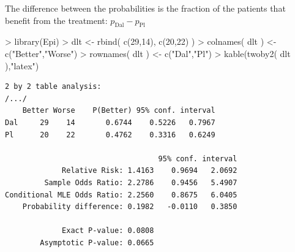 \documentclass[handout,12pt,dvipsnames,t]{beamer}
\begin{document}
\begin{frame}[fragile]
The difference between the probabilities is the fraction of the
patients that benefit from the treatment: $ p_\text{Dal}- p_\text{Pl}$


\begin{footnotesize}
\begin{Schunk}
\begin{Sinput}
> library(Epi)
> dlt <- rbind( c(29,14), c(20,22) )
> colnames( dlt ) <- c("Better","Worse")
> rownames( dlt ) <- c("Dal","Pl")
> kable(twoby2( dlt ),"latex")
\end{Sinput}
\end{Schunk}
\end{footnotesize}


\begin{footnotesize}
\begin{lstlisting}
2 by 2 table analysis:
/.../
    Better Worse    P(Better) 95% conf. interval
Dal     29    14       0.6744    0.5226   0.7967
Pl      20    22       0.4762    0.3316   0.6249

                                   95% conf. interval
             Relative Risk: 1.4163    0.9694   2.0692
         Sample Odds Ratio: 2.2786    0.9456   5.4907
Conditional MLE Odds Ratio: 2.2560    0.8675   6.0405
    Probability difference: 0.1982   -0.0110   0.3850

             Exact P-value: 0.0808
        Asymptotic P-value: 0.0665
\end{lstlisting}
\end{footnotesize}
\normalsize
\end{frame}
\end{document}
